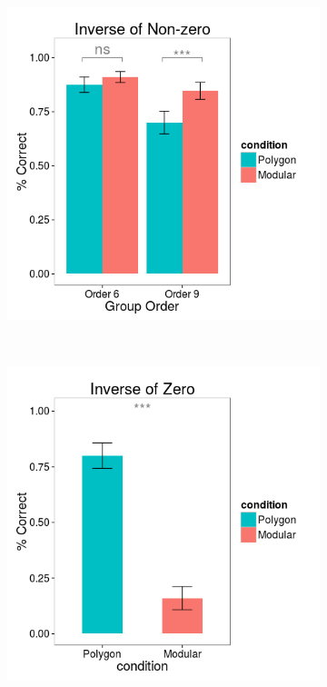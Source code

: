 \documentclass[man,10pt]{apa6}
\begin{document}
\begin{figure}[H]
\centering
\begin{subfigure}[c]{0.3\textwidth}
\centering
\includegraphics[width=\textwidth]{figures/1/in_NZ_r.png}
\end{subfigure}
~
\begin{subfigure}[c]{0.3\textwidth}
\centering
\includegraphics[width=\textwidth]{figures/1/in_Z_r.png}

\end{subfigure}
\end{figure}
\end{document}
